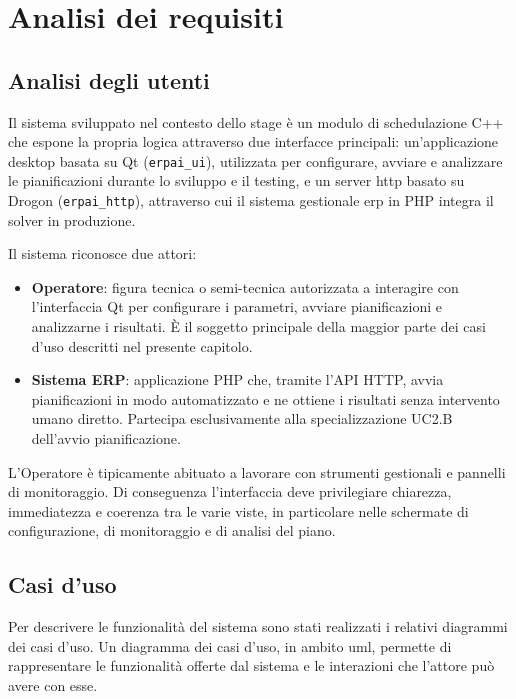 \chapter{Analisi dei requisiti}
\label{chap:analisi-requisiti}

\section{Analisi degli utenti}

Il sistema sviluppato nel contesto dello stage è un modulo di schedulazione C++ che espone la propria logica attraverso due interfacce principali: un'applicazione desktop basata su Qt (\texttt{erpai\_ui}), utilizzata per configurare, avviare e analizzare le pianificazioni durante lo sviluppo e il testing, e un server \gls{http} basato su Drogon (\texttt{erpai\_http}), attraverso cui il sistema gestionale \gls{erp} in PHP integra il solver in produzione.

Il sistema riconosce due attori:

\begin{itemize}
    \item \textbf{Operatore}: figura tecnica o semi-tecnica autorizzata a interagire con l'interfaccia Qt per configurare i parametri, avviare pianificazioni e analizzarne i risultati. È il soggetto principale della maggior parte dei casi d'uso descritti nel presente capitolo.
    \item \textbf{Sistema ERP}: applicazione PHP che, tramite l'API HTTP, avvia pianificazioni in modo automatizzato e ne ottiene i risultati senza intervento umano diretto. Partecipa esclusivamente alla specializzazione UC2.B dell'avvio pianificazione.
\end{itemize}

L'Operatore è tipicamente abituato a lavorare con strumenti gestionali e pannelli di monitoraggio. Di conseguenza l'interfaccia deve privilegiare chiarezza, immediatezza e coerenza tra le varie viste, in particolare nelle schermate di configurazione, di monitoraggio e di analisi del piano.

\section{Casi d'uso}

Per descrivere le funzionalità del sistema sono stati realizzati i relativi diagrammi dei casi d'uso. Un diagramma dei casi d'uso, in ambito \gls{uml}, permette di rappresentare le funzionalità offerte dal sistema e le interazioni che l'attore può avere con esse.

